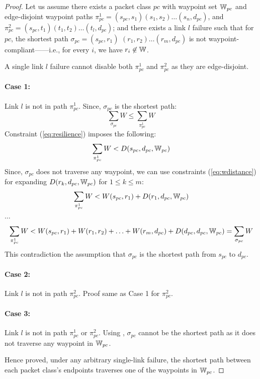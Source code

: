 \begin{proof}
	Let us assume there exists a packet class $pc$ with waypoint set $\mathbb{W}_{pc}$ 
	and edge-disjoint waypoint paths $\pi^1_{pc} = (s_{pc}, s_1)(s_1, s_2)\ldots (s_n, d_{pc})$, 
	and $\pi^2_{pc} = (s_{pc}, t_1)(t_1, t_2)\ldots (t_l, d_{pc})$; and there exists 
	a link $l$ failure 
	such that for $pc$, the 
	shortest path $\sigma_{pc}=(s_{pc}, r_1)$ $(r_1, r_2)\ldots (r_m, d_{pc})$ 
	is not waypoint-compliant------i.e.,  
	for every $i$, we have $r_i\not\in \mathbb{W}$.
	
	A single link $l$ failure cannot disable both $\pi_{pc}^1$ and $\pi_{pc}^2$ as they are 
	edge-disjoint. 
	\paragraph{Case 1:} Link $l$ is not in path $\pi_{pc}^1$. Since, $\sigma_{pc}$ is 
	the shortest path: 
	\[
	\sum_{\sigma_{pc}}W \leq \sum_{\pi_{pc}^1}W
	\]
	Constraint (\ref{eq:resilience}) imposes the following: 
	\[
	\sum_{\pi_{pc}^1}W < D(s_{pc}, d_{pc}, \mathbb{W}_{pc}) 
	\]
	Since, $\sigma_{pc}$ does not traverse any waypoint, we can use 
	constraints (\ref{eq:wdistance}) for expanding $D(r_k, d_{pc}, \mathbb{W}_{pc})$ 
	for $1 \leq k \leq m$: 
	\[
	\sum_{\pi_{pc}^1}W < W(s_{pc}, r_1) + D(r_1, d_{pc}, \mathbb{W}_{pc}) 
	\]
	\begin{center}
	$\ldots$
	\end{center}
	\[
	\sum_{\pi_{pc}^1}W < W(s_{pc}, r_1) + W(r_1, r_2) + \ldots + W(r_m, d_{pc}) + D(d_{pc}, d_{pc}, \mathbb{W}_{pc}) = \sum_{\sigma_{pc}}W
	\]
	This contradiction the assumption that $\sigma_{pc}$ is the shortest path from $s_{pc}$ to $d_{pc}$.

	\paragraph{Case 2:} Link $l$ is not in path $\pi_{pc}^2$. Proof same as Case 1 for $\pi_{pc}^2$. 
	\paragraph{Case 3:} Link $l$ is not in path $\pi_{pc}^1$ or $\pi_{pc}^2$. Using , 
	$\sigma_{pc}$ cannot be the shortest path as it does not traverse any waypoint in $\mathbb{W}_{pc}$. 
	
	Hence proved, under any arbitrary single-link failure, the shortest path between each packet class's 
	endpoints traverses one of the waypoints in $\mathbb{W}_{pc}$.
\end{proof}

